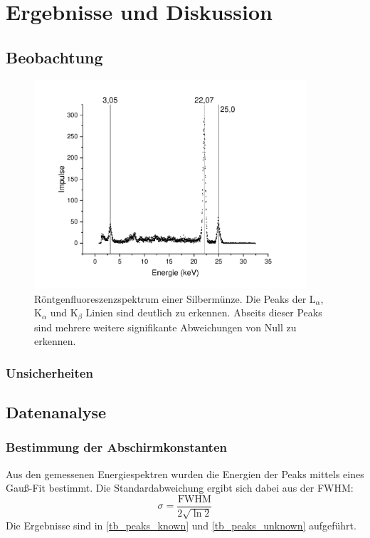 \documentclass[
	a4paper,
	12pt,
	pagesize,
	ngerman
]{scrartcl}
\begin{document}
	\section{Ergebnisse und Diskussion}
	

	\subsection{Beobachtung}
	
	\begin{figure}[H]
		\includegraphics[width=0.9\textwidth]{images/Silbermuenze}
		\centering
		\caption{Röntgenfluoreszenzspektrum einer Silbermünze. Die Peaks der $\text{L}_\alpha$, $\text{K}_\alpha$ und $\text{K}_\beta$ Linien sind deutlich zu erkennen. Abseits dieser Peaks sind mehrere weitere signifikante Abweichungen von Null zu erkennen.} %
		\label{fig_ag_plot}
		\centering
	\end{figure}
	
	\subsubsection{Unsicherheiten} %
	\subsection{Datenanalyse}
	\subsubsection{Bestimmung der Abschirmkonstanten}
	Aus den gemessenen Energiespektren wurden die Energien der Peaks mittels eines Gauß-Fit bestimmt.
	Die Standardabweichung ergibt sich dabei aus der FWHM:
	\begin{equation}
		\sigma = \frac{\text{FWHM}}{2\sqrt{\ln 2}}
	\end{equation}
	Die Ergebnisse sind in \cref{tb_peaks_known} und \cref{tb_peaks_unknown} aufgeführt.
	
\end{document}
